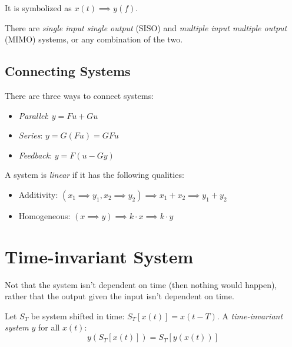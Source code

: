\documentclass[00_complete]{subfiles}
\begin{document}
It is symbolized as $x(t) \implies y(f)$.

There are \textit{single input single output} (SISO) and \textit{multiple input
multiple output} (MIMO) systems, or any combination of the two.

\subsection{Connecting Systems}
There are three ways to connect systems:
\begin{itemize}
    \item \textit{Parallel}: $y = Fu + Gu$
    \item \textit{Series}: $y = G(Fu) = GFu$
    \item \textit{Feedback}: $y = F(u - Gy)$
\end{itemize}
\begin{definition}
    A system is \textit{linear} if it has the following qualities:
    \begin{itemize}
        \item Additivity: $(x_1 \implies y_1, x_2 \implies y_2) \implies
            x_1+x_2\implies y_1+y_2$
        \item Homogeneous: $(x\implies y) \implies k\cdot x \implies k \cdot y$
    \end{itemize}
\end{definition}
\section{Time-invariant System}
Not that the system isn't dependent on time (then nothing would happen), rather
that the output given the input isn't dependent on time.
\begin{definition}
    Let $S_T$ be system shifted in time: $S_T[x(t)]=x(t-T)$. A
    \textit{time-invariant system} $y$ for all $x(t)$:
    \begin{displaymath}
        y(S_T[x(t)])=S_T[y(x(t))]
    \end{displaymath}
\end{definition}
\end{document}

